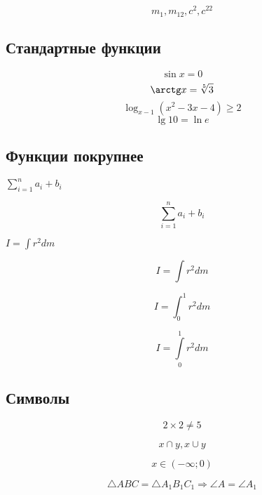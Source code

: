\documentclass[a4paper,12pt]{article} %
\begin{document}
\[ m_1, m_{12}, c^2, c^{22} \]

\subsection{Стандартные функции}

\[ \sin x=0 \]
\[ \arctg x=\sqrt[5]{3} \]
\[ \log_{x-1}{(x^2-3x-4)}\geqslant 2 \]
\[ \lg 10=\ln e \]

\subsection{Функции покрупнее}

$\sum_{i=1}^{n}a_i+b_i$

\[ \sum_{i=1}^{n}a_i+b_i \]

$I=\int r^2dm$

\[I=\int r^2dm \]

\[I=\int_{0}^{1} r^2dm \]

\[I=\int\limits_{0}^{1} r^2dm \]

\subsection{Символы}

\[2\times 2\neq 5 \]

\[x \cap y,  x \cup y\]

\[x\in (-\infty; 0)\]

\[ \triangle ABC = \triangle A_1B_1C_1 \Rightarrow \angle A= \angle A_1\]

\smiley
\end{document}
